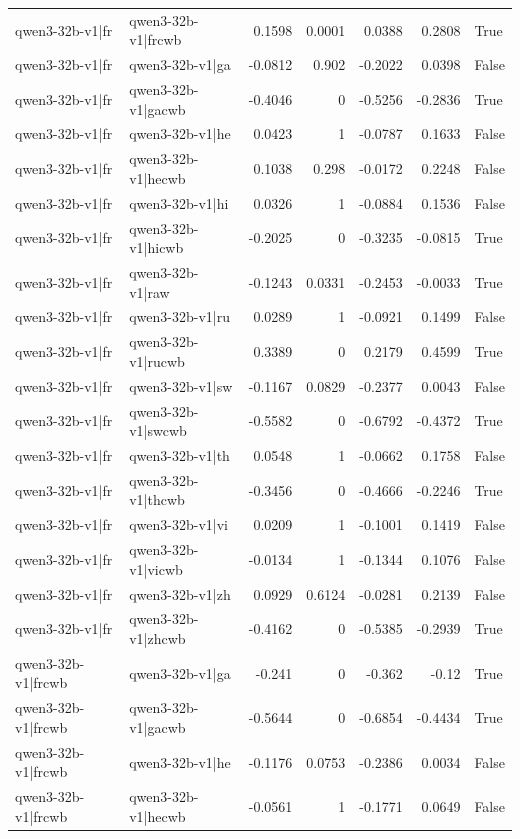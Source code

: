 \begin{table}
\begin{tabular}{l l r r r r l}
qwen3-32b-v1|fr & qwen3-32b-v1|frcwb & 0.1598 & 0.0001 & 0.0388 & 0.2808 & True \\
qwen3-32b-v1|fr & qwen3-32b-v1|ga & -0.0812 & 0.902 & -0.2022 & 0.0398 & False \\
qwen3-32b-v1|fr & qwen3-32b-v1|gacwb & -0.4046 & 0 & -0.5256 & -0.2836 & True \\
qwen3-32b-v1|fr & qwen3-32b-v1|he & 0.0423 & 1 & -0.0787 & 0.1633 & False \\
qwen3-32b-v1|fr & qwen3-32b-v1|hecwb & 0.1038 & 0.298 & -0.0172 & 0.2248 & False \\
qwen3-32b-v1|fr & qwen3-32b-v1|hi & 0.0326 & 1 & -0.0884 & 0.1536 & False \\
qwen3-32b-v1|fr & qwen3-32b-v1|hicwb & -0.2025 & 0 & -0.3235 & -0.0815 & True \\
qwen3-32b-v1|fr & qwen3-32b-v1|raw & -0.1243 & 0.0331 & -0.2453 & -0.0033 & True \\
qwen3-32b-v1|fr & qwen3-32b-v1|ru & 0.0289 & 1 & -0.0921 & 0.1499 & False \\
qwen3-32b-v1|fr & qwen3-32b-v1|rucwb & 0.3389 & 0 & 0.2179 & 0.4599 & True \\
qwen3-32b-v1|fr & qwen3-32b-v1|sw & -0.1167 & 0.0829 & -0.2377 & 0.0043 & False \\
qwen3-32b-v1|fr & qwen3-32b-v1|swcwb & -0.5582 & 0 & -0.6792 & -0.4372 & True \\
qwen3-32b-v1|fr & qwen3-32b-v1|th & 0.0548 & 1 & -0.0662 & 0.1758 & False \\
qwen3-32b-v1|fr & qwen3-32b-v1|thcwb & -0.3456 & 0 & -0.4666 & -0.2246 & True \\
qwen3-32b-v1|fr & qwen3-32b-v1|vi & 0.0209 & 1 & -0.1001 & 0.1419 & False \\
qwen3-32b-v1|fr & qwen3-32b-v1|vicwb & -0.0134 & 1 & -0.1344 & 0.1076 & False \\
qwen3-32b-v1|fr & qwen3-32b-v1|zh & 0.0929 & 0.6124 & -0.0281 & 0.2139 & False \\
qwen3-32b-v1|fr & qwen3-32b-v1|zhcwb & -0.4162 & 0 & -0.5385 & -0.2939 & True \\
qwen3-32b-v1|frcwb & qwen3-32b-v1|ga & -0.241 & 0 & -0.362 & -0.12 & True \\
qwen3-32b-v1|frcwb & qwen3-32b-v1|gacwb & -0.5644 & 0 & -0.6854 & -0.4434 & True \\
qwen3-32b-v1|frcwb & qwen3-32b-v1|he & -0.1176 & 0.0753 & -0.2386 & 0.0034 & False \\
qwen3-32b-v1|frcwb & qwen3-32b-v1|hecwb & -0.0561 & 1 & -0.1771 & 0.0649 & False \\

\end{tabular}
\end{table}
